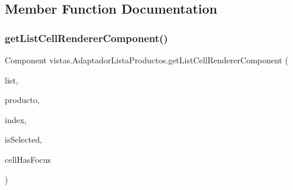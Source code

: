 \subsection{Member Function Documentation}
\mbox{\label{classvistas_1_1_adaptador_lista_productos_a11ec1a4af03c0af6d15446b47338dd9d}} 
\subsubsection{\texorpdfstring{get\+List\+Cell\+Renderer\+Component()}{getListCellRendererComponent()}}
{\footnotesize\ttfamily Component vistas.\+Adaptador\+Lista\+Productos.\+get\+List\+Cell\+Renderer\+Component (\begin{DoxyParamCaption}\item[{J\+List$<$? extends \mbox{\hyperlink{class_productos_1_1_producto}{Producto}} $>$}]{list,  }\item[{\mbox{\hyperlink{class_productos_1_1_producto}{Producto}}}]{producto,  }\item[{int}]{index,  }\item[{boolean}]{is\+Selected,  }\item[{boolean}]{cell\+Has\+Focus }\end{DoxyParamCaption})}

